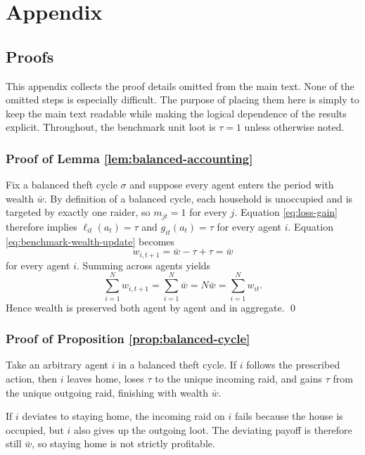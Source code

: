 \section{Appendix}

\subsection{Proofs}
\label{app:proofs}

This appendix collects the proof details omitted from the main text. None of the omitted steps is especially difficult. The purpose of placing them here is simply to keep the main text readable while making the logical dependence of the results explicit. Throughout, the benchmark unit loot is $\tau = 1$ unless otherwise noted.

\subsubsection*{Proof of Lemma \ref{lem:balanced-accounting}}

Fix a balanced theft cycle $\sigma$ and suppose every agent enters the period with wealth $\bar{w}$. By definition of a balanced cycle, each household is unoccupied and is targeted by exactly one raider, so $m_{jt}=1$ for every $j$. Equation \eqref{eq:loss-gain} therefore implies $\ell_{it}(a_t)=\tau$ and $g_{it}(a_t)=\tau$ for every agent $i$. Equation \eqref{eq:benchmark-wealth-update} becomes
\[
w_{i,t+1} = \bar{w} - \tau + \tau = \bar{w}
\]
for every agent $i$. Summing across agents yields
\[
\sum_{i=1}^{N} w_{i,t+1} = \sum_{i=1}^{N} \bar{w} = N \bar{w} = \sum_{i=1}^{N} w_{it}.
\]
Hence wealth is preserved both agent by agent and in aggregate. \qed

\subsubsection*{Proof of Proposition \ref{prop:balanced-cycle}}

Take an arbitrary agent $i$ in a balanced theft cycle. If $i$ follows the prescribed action, then $i$ leaves home, loses $\tau$ to the unique incoming raid, and gains $\tau$ from the unique outgoing raid, finishing with wealth $\bar{w}$.

If $i$ deviates to staying home, the incoming raid on $i$ fails because the house is occupied, but $i$ also gives up the outgoing loot. The deviating payoff is therefore still $\bar{w}$, so staying home is not strictly profitable.

